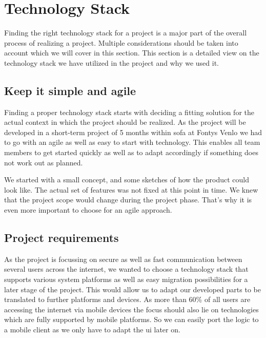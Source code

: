 \chapter{Technology Stack}\label{ch:technology-stack}
Finding the right technology stack for a project is a major part of the overall process of realizing a project.
Multiple considerations should be taken into account which we will cover in this section.
This section is a detailed view on the technology stack we have utilized in the project and why we used it.

\section{Keep it simple and agile}\label{sec:keep-it-simple-and-agile}

Finding a proper technology stack starts with deciding a fitting solution for the actual context in which the project
should be realized.
As the project will be developed in a short-term project of 5 months within \ac{sofa} at Fontys Venlo we
had to go with an agile as well as easy to start with technology.
This enables all team members to get started quickly as well as to adapt accordingly if something does not work out as
planned.

We started with a small concept, and some sketches of how the product could look like.
The actual set of features was not fixed at this point in time.
We knew that the project scope would change during the project phase.
That's why it is even more important to choose for an agile approach.

\section{Project requirements}\label{sec:project-requirements}

As the project is focussing on secure as well as fast communication between several users across the internet, we wanted
to choose a technology stack that supports various system platforms as well as easy migration possibilities for a later
stage of the project.
This would allow us to adapt our developed parts to be translated to further platforms and devices.
As more than 60\% of all users are accessing the internet via mobile devices the focus should also lie on technologies
which are fully supported by mobile platforms.
So we can easily port the logic to a mobile client as we only have to adapt the \ac{ui} later on.

